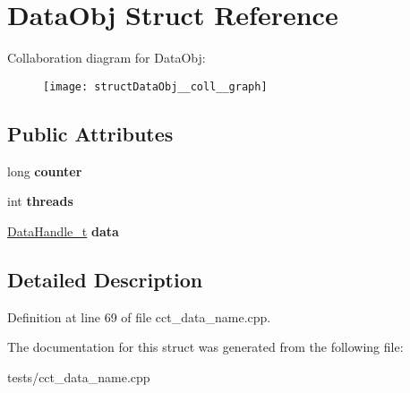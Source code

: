 \hypertarget{structDataObj}{\section{Data\-Obj Struct Reference}
\label{structDataObj}
}


Collaboration diagram for Data\-Obj\-:
\nopagebreak
\begin{figure}[H]
\begin{center}
\leavevmode
\texttt{[image: structDataObj\_\_coll\_\_graph]}
\end{center}
\end{figure}
\subsection*{Public Attributes}
\begin{DoxyCompactItemize}
\item 
\hypertarget{structDataObj_a5aea098a639996a09caa43487f1f96a3}{long {\bfseries counter}}\label{structDataObj_a5aea098a639996a09caa43487f1f96a3}

\item 
\hypertarget{structDataObj_a3aea5e973e740f5576c2e2c811294f72}{int {\bfseries threads}}\label{structDataObj_a3aea5e973e740f5576c2e2c811294f72}

\item 
\hypertarget{structDataObj_a3c64c7729010483dfa6279a87784b13d}{\hyperlink{structPinCCTLib_1_1DataHandle__t}{Data\-Handle\-\_\-t} {\bfseries data}}\label{structDataObj_a3c64c7729010483dfa6279a87784b13d}

\end{DoxyCompactItemize}


\subsection{Detailed Description}


Definition at line 69 of file cct\-\_\-data\-\_\-name.\-cpp.



The documentation for this struct was generated from the following file\-:\begin{DoxyCompactItemize}
\item 
tests/cct\-\_\-data\-\_\-name.\-cpp\end{DoxyCompactItemize}
